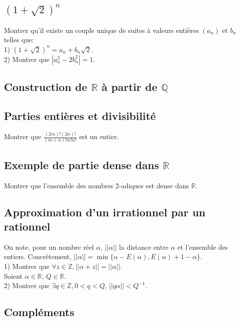 \documentclass{article}
\begin{document}
\subsection{$(1+\sqrt{2})^n$}
Montrer qu'il existe un couple unique de suites \`a valeurs enti\`eres $(a_n)$ et $b_n$ telles que:\\
1) $(1+\sqrt{2})^n=a_n+b_n\sqrt{2}$.\\
2) Montrer que $|a_n^2-2b_n^2|=1$.

\subsection{Construction de $\mathbb{R}$ \`a partir de $\mathbb{Q}$}

\subsection{Parties enti\`eres et divisibilit\'e}
Montrer que $\frac{(2m)!(2n)!}{(m+n)!m!n!}$ est un entier.

\subsection{Exemple de partie dense dans $\mathbb{R}$}
Montrer que l'ensemble des nombres 2-adiques est dense dans $\mathbb{R}$.

\subsection{Approximation d'un irrationnel par un rationnel}
On note, pour un nombre r\'eel $\alpha$, $||\alpha||$ la distance entre $\alpha$ et l'ensemble des entiers. Concr\`etement, $||\alpha||=\min\{\alpha-E(\alpha), E(\alpha)+1-\alpha\}$.\\
1) Montrer que $\forall z\in\mathbb{Z}, ||\alpha+z||=||\alpha||$.\\
Soient $\alpha\in\mathbb{R}$, $Q\in\mathbb{R}$.\\
2) Montrer que $\exists q\in\mathbb{Z}, 0<q<Q$, $||q\alpha||<Q^{-1}$.

\subsection{Compl\'ements}
\end{document}
